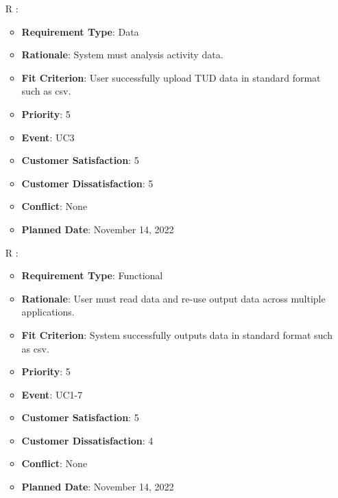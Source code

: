 \documentclass[12pt, titlepage]{article}
\newcounter{reqnum} %
\begin{document}
\begin{itemize}
\item[R\refstepcounter{reqnum}\thereqnum
\label{R_Inputs_1}:] 
\begin{itemize}
    \item \textbf{Requirement Type}: Data
    \item \textbf{Rationale}: System must analysis activity data.
    \item \textbf{Fit Criterion}: User successfully upload TUD data in standard format such as csv. 
    \item \textbf{Priority}: 5
    \item \textbf{Event}: UC3
    \item \textbf{Customer Satisfaction}: 5
    \item \textbf{Customer Dissatisfaction}: 5
    \item \textbf{Conflict}: None
    \item \textbf{Planned Date}: November 14, 2022
\end{itemize}

\item[R\refstepcounter{reqnum}\thereqnum
\label{R_Output_3}:] 
\begin{itemize}
    \item \textbf{Requirement Type}: Functional
    \item \textbf{Rationale}: User must read data and re-use output data across multiple applications.
    \item \textbf{Fit Criterion}: System successfully outputs data in standard format such as csv. 
    \item \textbf{Priority}: 5
    \item \textbf{Event}: UC1-7
    \item \textbf{Customer Satisfaction}: 5
    \item \textbf{Customer Dissatisfaction}: 4
    \item \textbf{Conflict}: None
    \item \textbf{Planned Date}: November 14, 2022
\end{itemize}


\end{itemize}
\end{document}
